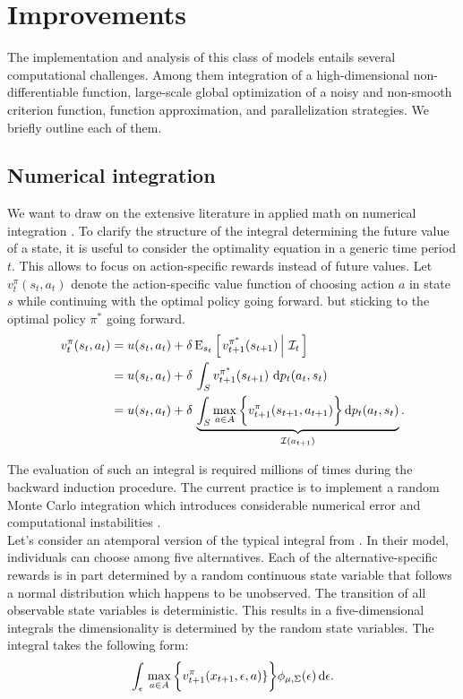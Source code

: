 \section{Improvements}\label{Computation}
The implementation and analysis of this class of models entails several computational challenges. Among them integration of a high-dimensional non-differentiable function, large-scale global optimization of a noisy and non-smooth criterion function, function approximation, and parallelization strategies. We briefly outline each of them.
\subsection{Numerical integration} We want to draw on the extensive literature in applied math on numerical integration \citep{Davis.2007}. To clarify the structure of the integral determining the future value of a state, it is useful to consider the optimality equation in a generic time period $t$. This allows to focus on action-specific rewards instead of future values. Let $v^{\pi}_{t}(s_t, a_t)$ denote the action-specific value function of choosing action $a$ in state $s$ while continuing with the optimal policy going forward.
but sticking to the optimal policy $\pi^*$ going forward.
%
\begin{align}
v^{\pi}_{t}(s_t, a_t) & = u(s_t, a_t) + \delta\,\mathrm{E}_{s_t} \left[\left.v^{\pi^*}_{t + 1}(s_{t + 1})\,\right\vert\,\mathcal{I}_t\,\right] \\
& =  u(s_t, a_t) + \delta\, \int_S v^{\pi^*}_{t + 1}(s_{t + 1})\, \mathop{}\!\mathrm{d} p_t(a_t, s_t)\\
& =  u(s_t, a_t) + \delta\, \underbrace{\int_S \max_{a \in A}\bigg\{v^\pi_{t + 1}(s_{t + 1}, a_{t + 1})\bigg\}\mathop{}\!\mathrm{d} p_t(a_t, s_t)}_{\mathcal{I}(a_{t + 1})}.
\end{align}

\noindent The evaluation of such an integral is required millions of times during the backward induction procedure. The current practice is to implement a random Monte Carlo integration which introduces considerable numerical error and computational instabilities \citep{Judd.2011}.\\

\noindent Let's consider an atemporal version of the typical integral from \citet{Keane.1997}. In their model, individuals can choose among five alternatives. Each of the alternative-specific rewards is in part determined by a random continuous state variable that follows a normal distribution which happens to be unobserved. The transition of all observable state variables is deterministic. This results in a five-dimensional integrals the dimensionality is determined by the random state variables. The integral takes the following form:
%
\begin{align*}
   \int_{\epsilon}\, \max_{a\in A} \bigg\{v_{t + 1}^\pi(x_{t + 1}, \epsilon, a)\}\bigg\} \phi_{\mu, \Sigma}(\epsilon) \mathop{}\!\mathrm{d}\epsilon.
\end{align*}

